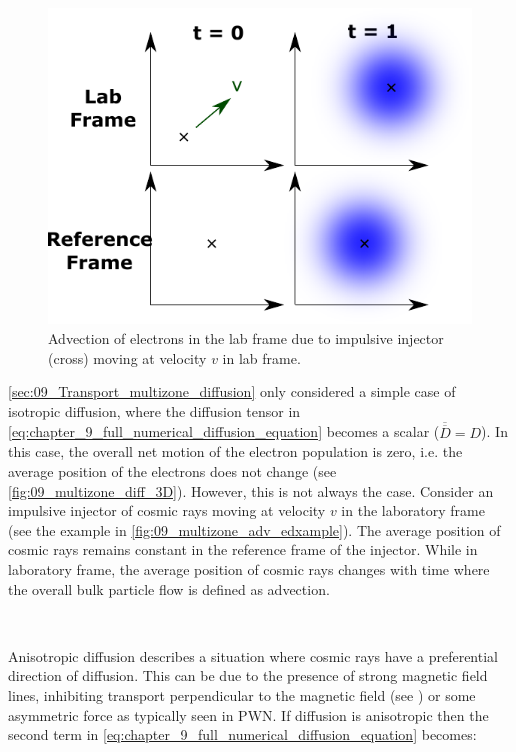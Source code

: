 \begin{figure}
    \centering
    \includegraphics{09_Multizone/Images/advection/adv_example.pdf}
    \caption{Advection of electrons in the lab frame due to impulsive injector (cross) moving at velocity $v$ in lab frame.}
    \label{fig:09_multizone_adv_edxample}
\end{figure}

\autoref{sec:09_Transport_multizone_diffusion} only considered a simple case of isotropic diffusion, where the diffusion tensor in \autoref{eq:chapter_9_full_numerical_diffusion_equation} becomes a scalar ($\overline{\overline{D}}=D$). In this case, the overall net motion of the electron population is zero, i.e. the average position of the electrons does not change (see \autoref{fig:09_multizone_diff_3D}). However, this is not always the case. Consider an impulsive injector of cosmic rays moving at velocity $v$ in the laboratory frame (see the example in \autoref{fig:09_multizone_adv_edxample}). The average position of cosmic rays remains constant in the reference frame of the injector. While in laboratory frame, the average position of cosmic rays changes with time where the overall bulk particle flow is defined as advection.
\par~\par
Anisotropic diffusion describes a situation where cosmic rays have a preferential direction of diffusion. This can be due to the presence of strong magnetic field lines, inhibiting transport perpendicular to the magnetic field (see \cite{2013ApJ...768...73M,2013MNRAS.429.1643N,2023arXiv230402684L}) or some asymmetric force as typically seen in PWN. If diffusion is anisotropic then the second term in \autoref{eq:chapter_9_full_numerical_diffusion_equation} becomes:

